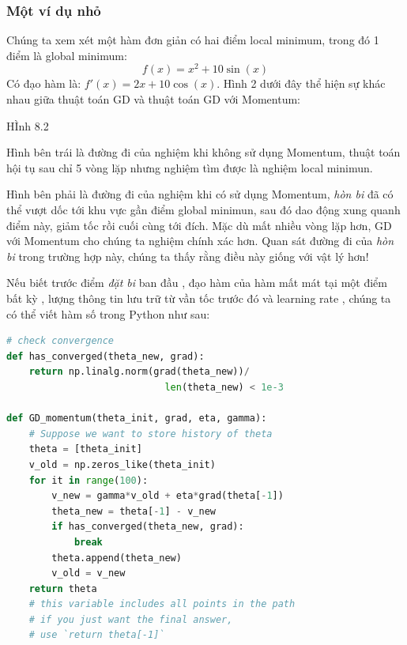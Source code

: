  
\subsubsection{Một ví dụ nhỏ}
Chúng ta xem xét một hàm đơn giản có hai điểm local minimum, trong đó 1 điểm là global minimum: 
\begin{equation} 
f(x) = x^2 + 10\sin(x) 
\end{equation} 
Có đạo hàm là: $f'(x) = 2x + 10\cos(x)$. Hình 2 dưới đây thể hiện sự khác nhau giữa thuật toán GD và thuật toán GD với Momentum: 
 
{\color{red} HÌnh 8.2} 
 
Hình bên trái là đường đi của nghiệm khi không sử dụng Momentum, thuật toán hội tụ sau chỉ 5 vòng lặp nhưng nghiệm tìm được là nghiệm local minimun. 
 
Hình bên phải là đường đi của nghiệm khi có sử dụng Momentum, \textit{hòn bi} đã có thể vượt dốc tới khu vực gần điểm global minimun, sau đó dao động xung quanh điểm này, giảm tốc rồi cuối cùng tới đích. Mặc dù mất nhiều vòng lặp hơn, GD với Momentum cho chúng ta nghiệm chính xác hơn. Quan sát đường đi của \textit{hòn bi} trong trường hợp này, chúng ta thấy rằng điều này giống với vật lý hơn! 
 
Nếu biết trước điểm \textit{đặt bi} ban đầu , đạo hàm của hàm mất mát tại một điểm bất kỳ , lượng thông tin lưu trữ từ vần tốc trước đó  và learning rate , chúng ta có thể viết hàm số  trong Python như sau: 
 
 
\begin{lstlisting}[language=Python]
# check convergence 
def has_converged(theta_new, grad): 
    return np.linalg.norm(grad(theta_new))/ 
                            len(theta_new) < 1e-3 
 
def GD_momentum(theta_init, grad, eta, gamma): 
    # Suppose we want to store history of theta 
    theta = [theta_init] 
    v_old = np.zeros_like(theta_init) 
    for it in range(100): 
        v_new = gamma*v_old + eta*grad(theta[-1]) 
        theta_new = theta[-1] - v_new 
        if has_converged(theta_new, grad): 
            break  
        theta.append(theta_new) 
        v_old = v_new 
    return theta  
    # this variable includes all points in the path 
    # if you just want the final answer,  
    # use `return theta[-1]` 
\end{lstlisting}
 
